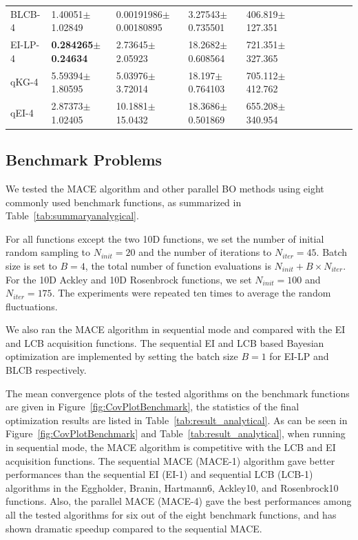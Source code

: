 \begin{table}[!htb]
\begin{tabular}{lllllllllll}
        BLCB-4  & 1.40051$\pm$1.02849           &  0.00191986$\pm$0.00180895          & 3.27543$\pm$0.735501          & 406.819$\pm$127.351 \\
        EI-LP-4 & \textbf{0.284265$\pm$0.24634} &  2.73645$\pm$2.05923                & 18.2682$\pm$0.608564          & 721.351$\pm$327.365 \\
        qKG-4   & 5.59394$\pm$1.80595           &  5.03976$\pm$3.72014                & 18.197$\pm$0.764103           & 705.112$\pm$412.762 \\
        qEI-4   & 2.87373$\pm$1.02405           &  10.1881$\pm$15.0432                & 18.3686$\pm$0.501869          & 655.208$\pm$340.954 \\
        \bottomrule
    \end{tabular}
\end{table}


\subsection{Benchmark Problems}

We tested the MACE algorithm and other parallel BO methods using eight commonly used benchmark
functions, as summarized in Table~\ref{tab:summaryanalygical}.


For all functions except the two 10D functions, we set the number of initial
random sampling to $N_{init} = 20$ and the number of iterations to $N_{iter} =
45$. Batch size is set to $B = 4$, the total number of function evaluations is
$N_{init} + B \times N_{iter}$. For the 10D Ackley and 10D Rosenbrock functions, we set
$N_{init} = 100$ and $N_{iter} = 175$. The experiments were repeated ten
times to average the random fluctuations.

We also ran the MACE algorithm in sequential mode and compared with the EI and LCB
acquisition functions. The sequential EI and LCB based Bayesian optimization
are implemented by setting the batch size $B = 1$ for EI-LP and BLCB
respectively.


The mean convergence plots of the tested algorithms on the benchmark functions are
given in Figure~\ref{fig:CovPlotBenchmark}, the statistics of the final
optimization results are listed in Table~\ref{tab:result_analytical}. As can be
seen in Figure~\ref{fig:CovPlotBenchmark} and Table~\ref{tab:result_analytical}, when running in sequential mode, the MACE
algorithm is competitive with the LCB and EI acquisition functions. The sequential MACE (MACE-1)
algorithm gave better performances than the sequential EI (EI-1) and sequential LCB (LCB-1) algorithms in the Eggholder,
Branin, Hartmann6, Ackley10, and Rosenbrock10 functions. Also, the parallel
MACE (MACE-4) gave the best performances among all the tested algorithms for
six out of the eight benchmark functions, and has shown dramatic speedup
compared to the sequential MACE.


